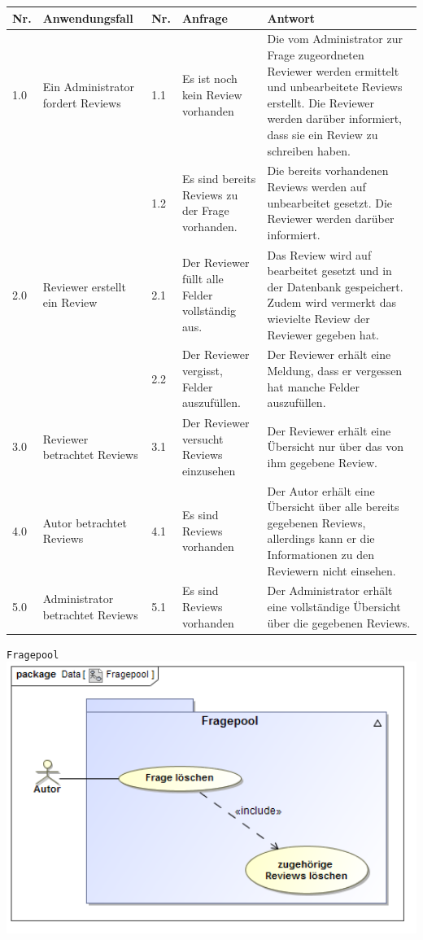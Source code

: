\documentclass[a4paper]{scrreprt}
\begin{document}
\begin{tabular}{|p{0.5cm}|p{3cm}|p{0.5cm}|p{4cm}|p{4.5cm}|}\hline
Nr. & Anwendungsfall & Nr. & Anfrage & Antwort\\\hline
1.0 & Ein Administrator fordert Reviews & 1.1 & Es ist noch kein Review vorhanden & Die vom Administrator zur Frage zugeordneten Reviewer werden ermittelt und unbearbeitete Reviews erstellt. Die Reviewer werden darüber informiert, dass sie ein Review zu schreiben haben.\\\hline
&&1.2 & Es sind bereits Reviews zu der Frage vorhanden. & Die bereits vorhandenen Reviews werden auf unbearbeitet gesetzt. Die Reviewer werden darüber informiert.\\\hline
2.0 & Reviewer erstellt ein Review & 2.1 & Der Reviewer füllt alle Felder vollständig aus. & Das Review wird auf bearbeitet gesetzt und in der Datenbank gespeichert. Zudem wird vermerkt das wievielte Review der Reviewer gegeben hat.\\\hline
&&2.2 & Der Reviewer vergisst, Felder auszufüllen. & Der Reviewer erhält eine Meldung, dass er vergessen hat manche Felder auszufüllen. \\\hline
3.0 & Reviewer betrachtet Reviews & 3.1 & Der Reviewer versucht Reviews einzusehen & Der Reviewer erhält eine Übersicht nur über das von ihm gegebene Review. \\\hline
4.0 & Autor betrachtet Reviews & 4.1 & Es sind Reviews vorhanden & Der Autor erhält eine Übersicht über alle bereits gegebenen Reviews, allerdings kann er die Informationen zu den Reviewern nicht einsehen. \\\hline
5.0 & Administrator betrachtet Reviews & 5.1 & Es sind Reviews vorhanden & Der Administrator erhält eine vollständige Übersicht über die gegebenen Reviews. \\\hline
\end{tabular}
 
\newpage
\texttt{Fragepool}\\

\includegraphics[width=1.0\textwidth]{Use_Case_Diagram__Fragepool.png}
\label{Fragepool bearbeiten}
\end{document}
